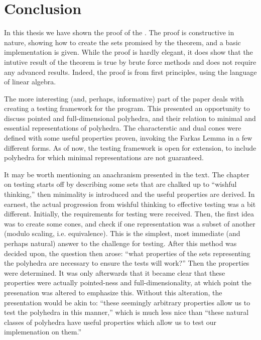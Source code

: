 \chapter*{Conclusion}

In this thesis we have shown the proof of the \MWT.  The proof is constructive in nature, showing how to create the sets promised by the theorem, and a basic implementation is given.  While the proof is hardly elegant, it does show that the intutive result of the theorem is true by brute force methods and does not require any advanced results.  Indeed, the proof is from first principles, using the language of linear algebra.

The more interesting (and, perhaps, informative) part of the paper deals with creating a testing framework for the program.  This presented an opportunity to discuss pointed and full-dimensional polyhedra, and their relation to minimal and essential representations of polyhedra.  The characterstic and dual cones were defined with some useful properties proven, invoking the Farkas Lemma in a few different forms.  As of now, the testing framework is open for extension, to include polyhedra for which minimal representations are not guaranteed.

It may be worth mentioning an anachranism presented in the text.  The chapter on testing starts off by describing some sets that are chalked up to ``wishful thinking,'' then minimality is introduced and the useful properties are derived.  In earnest, the actual progression from wishful thinking to effective testing was a bit different.  Initially, the requirements for testing were received.  Then, the first idea was to create some cones, and check if one representation was a subset of another (modulo scaling, i.e. equivalence).  This is the simplest, most immediate (and perhaps natural) answer to the challenge for testing.  After this method was decided upon, the question then arose: ``what properties of the sets representing the polyhedra are necessary to ensure the tests will work?''  Then the properties were determined.  It was only afterwards that it became clear that these properties were actually pointed-ness and full-dimensionality, at which point the presenation was altered to emphasize this.  Without this alteration, the presentation would be akin to: ``these seemingly arbitrary properties allow us to test the polyhedra in this manner,'' which is much less nice than ``these natural classes of polyhedra have useful properties which allow us to test our implemenation on them.''

